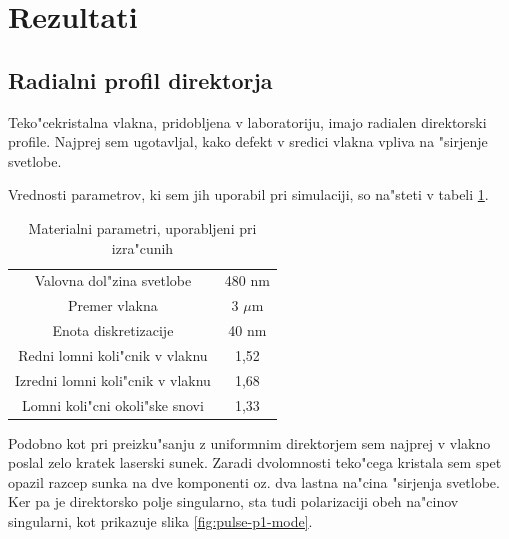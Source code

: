 \documentclass[a4paper,10pt]{article}
\begin{document}
\section{Rezultati}

\subsection{Radialni profil direktorja}

Teko"cekristalna vlakna, pridobljena v laboratoriju, imajo radialen direktorski profile. 
Najprej sem ugotavljal, kako defekt v sredici vlakna vpliva na "sirjenje svetlobe. 

Vrednosti parametrov, ki sem jih uporabil pri simulaciji, so na"steti v tabeli \ref{tab:parametri}. 

\begin{table}[!htbp]
\centering
 \begin{tabular}{|c|c|}
  \hline
  Valovna dol"zina svetlobe & 480 nm \\
  Premer vlakna & 3 $\mu$m \\
  Enota diskretizacije & 40 nm \\
  \hline
  Redni lomni koli"cnik v vlaknu & 1,52 \\
  Izredni lomni koli"cnik v vlaknu & 1,68 \\
  Lomni koli"cni okoli"ske snovi & 1,33 \\
  \hline
 \end{tabular}
 \caption{Materialni parametri, uporabljeni pri izra"cunih}
 \label{tab:parametri}
\end{table}

Podobno kot pri preizku"sanju z uniformnim direktorjem sem najprej v vlakno poslal zelo kratek laserski sunek. 
Zaradi dvolomnosti teko"cega kristala sem spet opazil razcep sunka na dve komponenti oz. dva lastna na"cina "sirjenja svetlobe. 
Ker pa je direktorsko polje singularno, sta tudi polarizaciji obeh na"cinov singularni, kot prikazuje slika \ref{fig:pulse-p1-mode}. 
\end{document}
